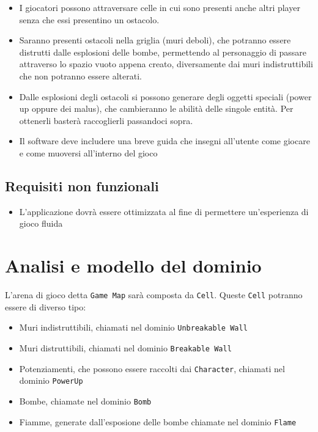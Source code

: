 \documentclass[a4paper,12pt]{report}
\begin{document}
\begin{itemize}
        \item I giocatori possono attraversare celle in cui sono presenti anche altri player senza che essi presentino un ostacolo.
        \item Saranno presenti ostacoli nella griglia (muri deboli), che potranno essere distrutti dalle esplosioni delle bombe, permettendo al personaggio di passare attraverso lo spazio vuoto appena creato, diversamente dai muri indistruttibili che non potranno essere alterati.
        \item Dalle esplosioni degli ostacoli si possono generare degli oggetti speciali (power up oppure dei malus), che cambieranno le abilità delle singole entità. Per ottenerli basterà raccoglierli passandoci sopra.
        \item Il software deve includere una breve guida che insegni all'utente come giocare e come muoversi all'interno del gioco
\end{itemize}

\subsection*{Requisiti non funzionali}
\begin{itemize}
    \item L’applicazione dovrà essere ottimizzata al fine di permettere un’esperienza di gioco fluida 
\end{itemize}

\section{Analisi e modello del dominio}

L'arena di gioco detta \verb|Game Map| sarà composta da \verb|Cell|. 
Queste \verb|Cell| potranno essere di diverso tipo: 

\begin{itemize}
    \item Muri indistruttibili, chiamati nel dominio \verb|Unbreakable Wall|
    \item Muri distruttibili, chiamati nel dominio \verb|Breakable Wall|
    \item Potenziamenti, che possono essere raccolti dai \verb|Character|, chiamati nel dominio \verb|PowerUp|
    \item Bombe, chiamate nel dominio \verb|Bomb|
    \item Fiamme, generate dall'esposione delle bombe chiamate nel dominio \verb|Flame|
\end{itemize}
\end{document}
